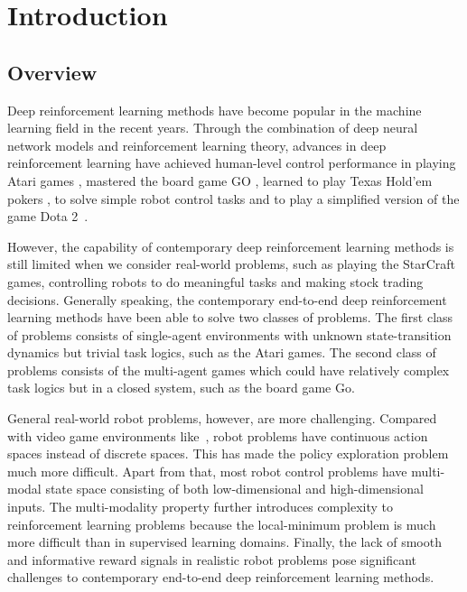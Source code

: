
\chapter{Introduction}
\section{Overview}
Deep reinforcement learning methods have become popular in the machine learning field in the recent years. Through the combination of deep neural network models and reinforcement learning theory, advances in deep reinforcement learning have achieved human-level control performance in playing Atari games \cite{mnih2015human}, mastered the board game GO \cite{silver2016mastering}, learned to play Texas Hold'em pokers \cite{heinrich2016deep}, to solve simple robot control tasks \cite{duan2016benchmarking} and to play a simplified version of the game Dota 2~\cite{openai_2018}.

However, the capability of contemporary deep reinforcement learning methods is still limited when we consider real-world problems, such as playing the StarCraft games, controlling robots to do meaningful tasks and making stock trading decisions. Generally speaking, the contemporary end-to-end deep reinforcement learning methods have been able to solve two classes of problems. The first class of problems consists of single-agent environments with unknown state-transition dynamics but trivial task logics, such as the Atari games. The second class of problems consists of the multi-agent games which could have relatively complex task logics but in a closed system, such as the board game Go. 

General real-world robot problems, however, are more challenging. Compared with video game environments like~\cite{mnih2015human}, robot problems have continuous action spaces instead of discrete spaces. This has made the policy exploration problem much more difficult. Apart from that, most robot control problems have multi-modal state space consisting of both low-dimensional and high-dimensional inputs. The multi-modality property further introduces complexity to reinforcement learning problems because the local-minimum problem is much more difficult than in supervised learning domains. Finally, the lack of smooth and informative reward signals in realistic robot problems pose significant challenges to contemporary end-to-end deep reinforcement learning methods.

